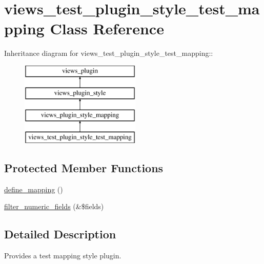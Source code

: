 \hypertarget{classviews__test__plugin__style__test__mapping}{
\section{views\_\-test\_\-plugin\_\-style\_\-test\_\-mapping Class Reference}
\label{classviews__test__plugin__style__test__mapping}
}
Inheritance diagram for views\_\-test\_\-plugin\_\-style\_\-test\_\-mapping::\begin{figure}[H]
\begin{center}
\leavevmode
\includegraphics[height=4cm]{classviews__test__plugin__style__test__mapping}
\end{center}
\end{figure}
\subsection*{Protected Member Functions}
\begin{DoxyCompactItemize}
\item 
\hyperlink{classviews__test__plugin__style__test__mapping_a40be2a1b82e66c70464a489a15a56e1a}{define\_\-mapping} ()
\item 
\hyperlink{classviews__test__plugin__style__test__mapping_ab5b5f3002b5814e4d7a4f5543ca3633d}{filter\_\-numeric\_\-fields} (\&\$fields)
\end{DoxyCompactItemize}


\subsection{Detailed Description}
Provides a test mapping style plugin. 

